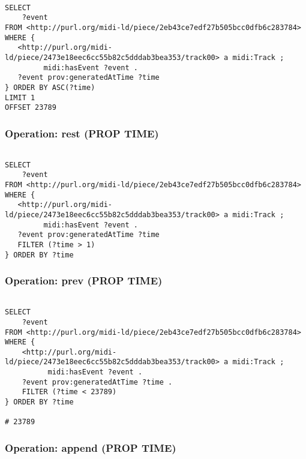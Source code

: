 \begin{lstlisting}[language=sparql]

SELECT
	?event
FROM <http://purl.org/midi-ld/piece/2eb43ce7edf27b505bcc0dfb6c283784>
WHERE {
   <http://purl.org/midi-ld/piece/2473e18eec6cc55b82c5dddab3bea353/track00> a midi:Track ;
         midi:hasEvent ?event .
   ?event prov:generatedAtTime ?time
} ORDER BY ASC(?time)
LIMIT 1
OFFSET 23789

\end{lstlisting}

\subsubsection{Operation: rest (PROP TIME)}
\label{query:PROP\-TIME:rest}

\begin{lstlisting}[language=sparql]

SELECT
	?event
FROM <http://purl.org/midi-ld/piece/2eb43ce7edf27b505bcc0dfb6c283784>
WHERE {
   <http://purl.org/midi-ld/piece/2473e18eec6cc55b82c5dddab3bea353/track00> a midi:Track ;
         midi:hasEvent ?event .
   ?event prov:generatedAtTime ?time
   FILTER (?time > 1)
} ORDER BY ?time

\end{lstlisting}

\subsubsection{Operation: prev (PROP TIME)}
\label{query:PROP\-TIME:prev}

\begin{lstlisting}[language=sparql]

SELECT
	?event
FROM <http://purl.org/midi-ld/piece/2eb43ce7edf27b505bcc0dfb6c283784>
WHERE {
    <http://purl.org/midi-ld/piece/2473e18eec6cc55b82c5dddab3bea353/track00> a midi:Track ;
          midi:hasEvent ?event .
    ?event prov:generatedAtTime ?time .
    FILTER (?time < 23789)
} ORDER BY ?time

# 23789

\end{lstlisting}

\subsubsection{Operation: append (PROP TIME)}
\label{query:PROP\-TIME:append}

